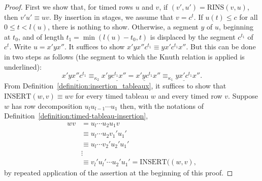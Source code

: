 \documentclass[10pt]{amsproc}
\theoremstyle{definition}
\theoremstyle{remark}
\newcommand{\rowins}{\mathrm{RINS}}
\newcommand{\ins}{\mathrm{INSERT}}
\begin{document}
\begin{proof}
  First we show that, for timed rows $u$ and $v$, if $(v',u')=\rowins(v,u)$, then $v'u'\equiv uv$.
  By insertion in stages, we assume that $v=c^t$.
  If $u(t)\leq c$ for all $0\leq t<l(u)$, there is nothing to show.
  Otherwise, a segment $y$ of $u$, beginning at $t_0$, and of length $t_1=\min(l(u)-t_0,t)$ is displaced by the segment $c^{t_1}$ of $c^t$.
  Write $u=x'yx''$.
  It suffices to show $x'yx''c^{t_1}\equiv yx'c^{t_1}x''$.
  But this can be done in two steps as follows (the segment to which the Knuth relation is applied is underlined):
  \begin{displaymath}
    x'\underline{y x'' c^{t_1}} \equiv_{\kappa_2} x'\underline{yc^{t_1}x''} = \underline{x'yc^{t_1}}x'' \equiv_{\kappa_1} \underline{yx'c^{t_1}}x''.
  \end{displaymath}
  From Definition~\ref{definition:insertion_tableaux}, it suffices to show that $\ins(w,v)\equiv wv$ for every timed tableau $w$ and every timed row $v$.
  Suppose $w$ has row decomposition $u_lu_{l-1}\dotsb u_1$ then, with the notations of Definition~\ref{definition:timed-tableau-insertion},
  \begin{align*}
    wv &= u_l\dotsb u_2u_1 v\\
       &\equiv u_l \dotsb u_2v_1'u_1'\\
       &\equiv u_l \dotsb v_2'u_2'u_1'\\
       & \vdots\\
       &\equiv v_l'u_l'\dotsb u_2'u_1' = \ins((w,v),
  \end{align*}
  by repeated application of the assertion at the beginning of this proof.
\end{proof}
\end{document}
